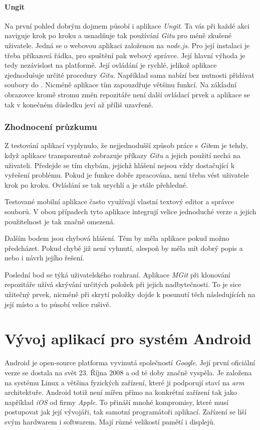         \subsubsection{Ungit~}
        Na první pohled dobrým dojmem působí i aplikace \emph{Ungit}. Ta vás při každé akci naviguje krok po kroku a usnadňuje tak používání \emph{Gitu} pro méně zkušené uživatele. Jedná se o webovou aplikaci založenou na \emph{node.js}. Pro její instalaci je třeba příkazová řádka, pro spuštění pak webový správce. Její hlavní výhoda je tedy nezávislost na platformě. Její ovládání je rychlé, jelikož aplikace zjednodušuje určité procedury \emph{Gitu}. Například sama nabízí  bez nutnosti přidávat soubory do . Nicméně aplikace tím zapouzdřuje většinu funkcí. Na základní obrazovce kromě stromu změn repozitáře není další ovládací prvek a aplikace se tak v konečném důsledku jeví až příliš uzavřeně.

    \subsection{Zhodnocení průzkumu}
    Z testování aplikací vyplynulo, že nejjednodušší způsob práce s \emph{Git}em je tehdy, když aplikace transparentně zobrazuje příkazy \emph{Gitu} a jejich použití nechá na uživateli. Předejde se tím chybám, jejichž hlášení nejsou vždy dostačující k vyřešení problému. Pokud je funkce dobře zpracována, není třeba vést uživatele krok po kroku. Ovládání se tak urychlí a je stále přehledné.

    Testované mobilní aplikace často využívají vlastní textový editor a správce souborů. V obou případech tyto aplikace integrují velice jednoduché verze a jejich použitelnost je tak značně omezená.

    Dalším bodem jsou chybová hlášení. Těm by měla aplikace pokud možno předcházet. Pokud chybě již není vyhnutí, alespoň by měla mít dobrý popis a nebo i návrh jejího řešení.

    Poslední bod se týká uživatelského rozhraní. Aplikace \emph{MGit} při klonování repozitáře užívá skrývání určitých položek při jejich nadbytečnosti. To je sice užitečný prvek, nicméně při skrytí položky dojde k posunutí těch následujících na její místo a to působí velice rušivě.

\chapter{Vývoj aplikací pro systém Android}
Android je open-source platforma vyvinutá společností \emph{Google}. Její první oficiální verze se dostala na svět 23. Října 2008 a od té doby značně vyspěla. Je založena na systému Linux a většina fyzických zařízení, které ji podporují staví na \emph{arm} architektuře. Android totiž není mířen přímo na konkrétní zařízení tak jako například \emph{iOS} od firmy \emph{Apple}. To přináší mnohé kompromisy, které musí postupovat jak její vývojáři, tak samotní programátoři aplikací. Zařízení se liší svým hardwarem i softwarem. Mají různé velikostí pamětí i displejů.

